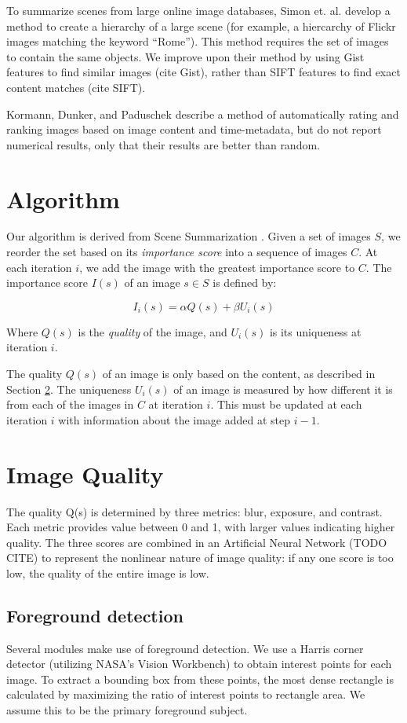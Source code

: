 \documentclass{sig-alternate}
\begin{document}
To summarize scenes from large online image databases, Simon et. al. develop a method to create a hierarchy of a large scene (for example, a hiercarchy of Flickr images matching the keyword ``Rome''). This method requires the set of images to contain the same objects. We improve upon their method by using Gist features to find similar images (cite Gist), rather than SIFT features to find exact content matches (cite SIFT).

Kormann, Dunker, and Paduschek\cite{springerlink:10.1007/978-3-642-10543-2_23} describe a method of automatically rating and ranking images based on image content and time-metadata, but do not report numerical results, only that their results are better than random. 

\section{Algorithm}
Our algorithm is derived from Scene Summarization \cite{Simon2007}. Given a set of images $S$, we reorder the set based on its \emph{importance score} into a sequence of images $C$. At each iteration $i$, we add the image with the greatest importance score to $C$. The importance score $I(s)$ of an image $s \in S$ is defined by:

$$
I_i(s) = \alpha Q(s) + \beta U_i(s)
$$

Where $Q(s)$ is the \emph{quality} of the image, and $U_i(s)$ is its uniqueness at iteration $i$.

The quality $Q(s)$ of an image is only based on the content, as described in Section \ref{section:quality}. The uniqueness $U_i(s)$ of an image is measured by how different it is from each of the images in $C$ at iteration $i$. This must be updated at each iteration $i$ with information about the image added at step $i-1$.

\section{Image Quality}
\label{section:quality}

The quality Q(s) is determined by three metrics: blur, exposure, and contrast. Each metric provides value between 0 and 1, with larger values indicating higher quality. The three scores are combined in an Artificial Neural Network (TODO CITE) to represent the nonlinear nature of image quality: if any one score is too low, the quality of the entire image is low.

\subsection{Foreground detection}\label{ContentRecognition}
Several modules make use of foreground detection. We use a Harris corner detector\cite{Harris} (utilizing NASA's Vision Workbench\cite{vision-workbench}) to obtain interest points for each image. To extract a bounding box from these points, the most dense rectangle is calculated by maximizing the ratio of interest points to rectangle area. We assume this to be the primary foreground subject.
\end{document}
